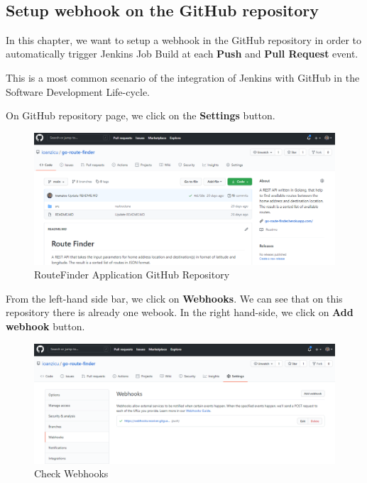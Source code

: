 \documentclass[12pt,a4paper,twoside]{article}
\begin{document}
~\newpage


\subsection{Setup webhook on the GitHub repository}


In this chapter, we want to setup a webhook in the GitHub repository in order to automatically trigger Jenkins Job Build at each \textbf{Push} and \textbf{Pull Request} event. 

This is a most common scenario of the integration of Jenkins with GitHub in the Software Development Life-cycle.


On GitHub repository page, we click on the \textbf{Settings} button.


\begin{figure}[H]
    \centering
        \includegraphics[width=15cm]{images-aws/40-github-project.png}
        \caption{RouteFinder Application GitHub Repository}
\end{figure}


From the left-hand side bar, we click on \textbf{Webhooks}. We can see that on this repository there is already one webook. In the right hand-side, we click on \textbf{Add webhook} button.


\begin{figure}[H]
    \centering
        \includegraphics[width=15cm]{images-aws/41-web-hook.png}
        \caption{Check Webhooks}
\end{figure}
\end{document}

